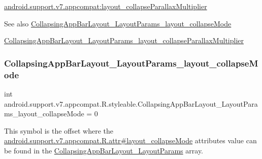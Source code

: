 {\ttfamily \hyperlink{classandroid_1_1support_1_1v7_1_1appcompat_1_1R_1_1styleable_a781b2b43f44b07db5eb37ae584beb420}{android.\+support.\+v7.\+appcompat\+:layout\+\_\+collapse\+Parallax\+Multiplier}}

\begin{DoxySeeAlso}{See also}
\hyperlink{classandroid_1_1support_1_1v7_1_1appcompat_1_1R_1_1styleable_ab64b1431cc65e19392ff67fdd7a12d3c}{Collapsing\+App\+Bar\+Layout\+\_\+\+Layout\+Params\+\_\+layout\+\_\+collapse\+Mode} 

\hyperlink{classandroid_1_1support_1_1v7_1_1appcompat_1_1R_1_1styleable_a781b2b43f44b07db5eb37ae584beb420}{Collapsing\+App\+Bar\+Layout\+\_\+\+Layout\+Params\+\_\+layout\+\_\+collapse\+Parallax\+Multiplier} 
\end{DoxySeeAlso}
\mbox{\label{classandroid_1_1support_1_1v7_1_1appcompat_1_1R_1_1styleable_ab64b1431cc65e19392ff67fdd7a12d3c}} 
\subsubsection{\texorpdfstring{Collapsing\+App\+Bar\+Layout\+\_\+\+Layout\+Params\+\_\+layout\+\_\+collapse\+Mode}{CollapsingAppBarLayout\_LayoutParams\_layout\_collapseMode}}
{\footnotesize\ttfamily int android.\+support.\+v7.\+appcompat.\+R.\+styleable.\+Collapsing\+App\+Bar\+Layout\+\_\+\+Layout\+Params\+\_\+layout\+\_\+collapse\+Mode = 0\hspace{0.3cm}{\ttfamily [static]}}

This symbol is the offset where the \hyperlink{classandroid_1_1support_1_1v7_1_1appcompat_1_1R_1_1attr_aa20fa9883f29d3efd81f079d8a773820}{android.\+support.\+v7.\+appcompat.\+R.\+attr\#layout\+\_\+collapse\+Mode} attribute\textquotesingle{}s value can be found in the \hyperlink{classandroid_1_1support_1_1v7_1_1appcompat_1_1R_1_1styleable_a12010970910a1c80a9bf9f6983f00001}{Collapsing\+App\+Bar\+Layout\+\_\+\+Layout\+Params} array.

